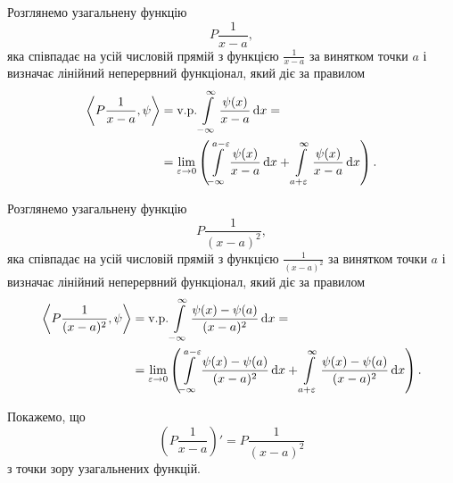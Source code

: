 \begin{example}
	Розглянемо узагальнену функцію
	\begin{equation}
		P \frac{1}{x - a},
	\end{equation}
	яка співпадає на усій числовій прямій з функцією $\frac{1}{x - a}$ за винятком точки $a$ і визначає лінійний неперервний функціонал, який діє за правилом
	\begin{equation}
		\begin{aligned}
			\langle P \frac{1}{x - a}, \psi \rangle &= \text{v.p.} \Int_{-\infty}^\infty \frac{\psi(x)}{x - a} \diff x = \\
			&= \Lim_{\epsilon \to 0} \left( \Int_{-\infty}^{a - \epsilon}\frac{\psi(x)}{x - a} \diff x + \Int_{a + \epsilon}^\infty \frac{\psi(x)}{x - a} \diff x \right).
		\end{aligned}
	\end{equation}

	Розглянемо узагальнену функцію
	\begin{equation}
		P \frac{1}{(x - a)^2},
	\end{equation}
	яка співпадає на усій числовій прямій з функцією $\frac{1}{(x - a)^2}$ за винятком точки $a$ і визначає лінійний неперервний функціонал, який діє за правилом
	\begin{equation}
		\begin{aligned}
			\langle P \frac{1}{(x - a)^2}, \psi \rangle &= \text{v.p.} \Int_{-\infty}^\infty \frac{\psi(x) - \psi(a)}{(x - a)^2} \diff x = \\
			&= \Lim_{\epsilon \to 0} \left( \Int_{-\infty}^{a - \epsilon}\frac{\psi(x) - \psi(a)}{(x - a)^2} \diff x + \Int_{a + \epsilon}^\infty \frac{\psi(x) - \psi(a)}{(x - a)^2} \diff x \right).
		\end{aligned}
	\end{equation}

	Покажемо, що 
	\begin{equation}
		\left( P \frac{1}{x - a} \right)' = P \frac{1}{(x - a)^2}
	\end{equation}
	з точки зору узагальнених функцій.
\end{example}

